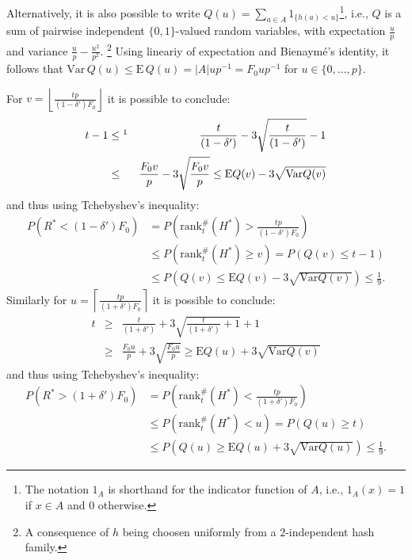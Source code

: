 \documentclass[11pt,a4paper]{article}
\newcommand{\var}{\mathrm{Var}}
\newcommand{\expectation}{\mathrm{E}}
\begin{document}
Alternatively, it is also possible to write $Q(u) = \sum_{a \in A} 1_{\{h(a) < u\}}$\footnote{The notation $1_A$ is shorthand for the indicator function of $A$, i.e., $1_A(x)=1$ if $x \in A$ and $0$ otherwise.}, i.e., $Q$ is a sum of pairwise independent $\{0,1\}$-valued random variables, with expectation $\frac{u}{p}$ and variance $\frac{u}{p} - \frac{u^2}{p^2}$.
\footnote{A consequence of $h$ being choosen uniformly from a $2$-independent hash family.}
Using lineariy of expectation and Bienaym\'e's identity, it follows that $\var \, Q(u) \leq \expectation \, Q(u) = |A|u p^{-1} = F_0 u p^{-1}$ for $u \in \{0,\ldots,p\}$.

For $v = \left\lfloor \frac{tp}{(1-\delta') F_0} \right\rfloor$ it is possible to conclude:
\begin{eqnarray*}
    t-1 & \leq\footnotemark & \frac{t}{(1-\delta')} - 3\sqrt{\frac{t}{(1-\delta')}} - 1 \\
     &\leq&  \frac{F_0 v}{p} - 3 \sqrt{\frac{F_0 v}{p}} \leq \expectation Q(v) - 3 \sqrt{\var Q(v)}
\end{eqnarray*}
and thus using Tchebyshev's inequality:
\begin{align}
    P\left(R^* < \left(1-\delta'\right) F_0\right) & = P\left(\mathrm{rank}_t^{\#}(H^*) > \frac{tp}{(1-\delta')F_0}\right) \nonumber \\ 
    & \leq P(\mathrm{rank}_t^{\#}(H^*) \geq v) = P(Q(v) \leq t-1) \label{eq:r_star_upper_bound} \\
    & \leq P\left(Q(v) \leq \expectation Q(v) - 3 \sqrt{\var Q(v)}\right) \leq \frac{1}{9} \textrm{.} \nonumber
\end{align}
Similarly for $u = \left\lceil \frac{tp}{(1+\delta') F_0} \right\rceil$ it is possible to conclude:
\begin{eqnarray*}
    t & \geq & \frac{t}{(1+\delta')} + 3\sqrt{\frac{t}{(1+\delta')}+1} + 1 \\
     &\geq&  \frac{F_0 u}{p} + 3 \sqrt{\frac{F_0 u}{p}} \geq \expectation Q(u) + 3 \sqrt{\var Q(v)}
\end{eqnarray*}
and thus using Tchebyshev's inequality:
\begin{align}
    P\left(R^* > \left(1+\delta'\right) F_0\right) & = P\left(\mathrm{rank}_t^{\#}(H^*) < \frac{tp}{(1+\delta')F_0}\right) \nonumber \\ 
    & \leq P(\mathrm{rank}_t^{\#}(H^*) < u) = P(Q(u) \geq t) \label{eq:r_star_lower_bound} \\
    & \leq P\left(Q(u) \geq \expectation Q(u) + 3 \sqrt{\var Q(u)}\right) \leq \frac{1}{9} \textrm{.} \nonumber
\end{align}
\end{document}
